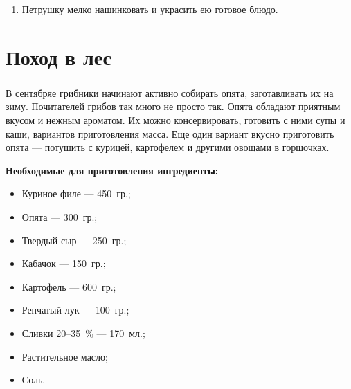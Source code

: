 \documentclass[t]{beamer}  %
\begin{document}
\begin{frame}
{\begin{enumerate}
			\item Петрушку мелко нашинковать и украсить ею готовое блюдо.
		\end{enumerate}
	}
\end{frame}

\section{Поход в лес} 
\begin{frame} %
	\frametitle{\insertsection}
	В сентябряе грибники начинают активно собирать опята, заготавливать их на зиму. Почитателей грибов так много не просто так. Опята обладают приятным вкусом и нежным ароматом. Их можно консервировать, готовить с ними супы и каши, вариантов приготовления масса. Еще один вариант вкусно приготовить опята --- потушить с курицей, картофелем и другими овощами в горшочках. \pause
	
	\textbf{Необходимые для приготовления ингредиенты:}
	\begin{multicols}{2}
		\begin{itemize}
			\item Куриное филе --- 450~гр.;
			\item Опята --- 300~гр.;
			\item Твердый сыр --- 250~гр.;
			\item Кабачок --- 150~гр.;
			\item Картофель --- 600~гр.;
			\item Репчатый лук --- 100~гр.;
			\item Сливки 20--35~\% --- 170~мл.;
			\item Растительное масло;
			\item Соль.
		\end{itemize}	
	\end{multicols}
\end{frame}	
\end{document}
